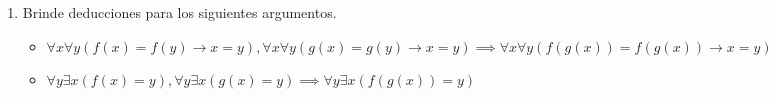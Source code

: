 \begin{enumerate}
    \item Brinde deducciones para los siguientes argumentos.

    \begin{multicols}{2}
    \begin{itemize}
        \item $\forall x \forall y (f(x) = f(y) \rightarrow x = y), \forall x \forall y (g(x) = g(y) \rightarrow x = y) \implies \forall x  \forall y (f(g(x)) = f(g(x)) \rightarrow x = y )$
    \end{itemize}
    \columnbreak
    \begin{itemize}
        \item $\forall y \exists x (f(x) = y) , \forall y \exists x (g(x) = y) \implies \forall y \exists x (f(g(x)) = y ) $
    \end{itemize}
    \end{multicols}

    \begin{solucion}


\end{solucion}
\end{enumerate}

